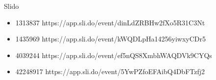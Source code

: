 \begin{frame}{Slido}

\vfill

\begin{itemize}
    \item 1313837 https://app.sli.do/event/dinLdZRBHw2fXo5R31C3Nt
    \item 1435969 https://app.sli.do/event/kWQDLpHa14256yiwxyCDr5
    \item 4039244 https://app.sli.do/event/ef5nQS8XmbhWAQDVk9CYQs
    \item 42248917 https://app.sli.do/event/5YwPZfoEFAibQ4DbFTzfj2
\end{itemize}

\vfill

\end{frame}



\endlecture

